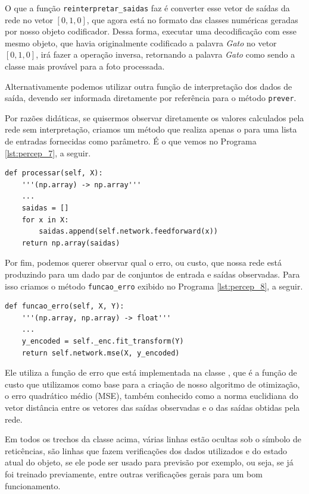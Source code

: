 O que a função \texttt{reinterpretar\_saidas} faz é converter esse vetor de saídas da rede no vetor $[0, 1, 0]$, que agora está no formato das classes numéricas geradas por nosso objeto codificador. Dessa forma, executar uma decodificação com esse mesmo objeto, que havia originalmente codificado a palavra \emph{Gato} no vetor $[0, 1, 0]$, irá fazer a operação inversa, retornando a palavra \emph{Gato} como sendo a classe mais provável para a foto processada.

Alternativamente podemos utilizar outra função de interpretação dos dados de saída, devendo ser informada diretamente por referência para o método \texttt{prever}.

Por razões didáticas, se quisermos observar diretamente os valores calculados pela rede sem interpretação, criamos um método que realiza apenas o  para uma lista de entradas fornecidas como parâmetro. É o que vemos no Programa \ref{lst:percep_7}, a seguir.
\newline
\estiloR
\begin{lstlisting}[caption={Trecho da classe \eng{Perceptron}}, label={lst:percep_7}, escapeinside={\%}]
def processar(self, X):
    '''(np.array) -> np.array'''
    ...
    saidas = []
    for x in X:
        saidas.append(self.network.feedforward(x))
    return np.array(saidas)
\end{lstlisting}


Por fim, podemos querer observar qual o erro, ou custo, que nossa rede está produzindo para um dado par de conjuntos de entrada e saídas observadas. Para isso criamos o método \texttt{funcao\_erro} exibido no Programa \ref{lst:percep_8}, a seguir. 
\newline
\estiloR
\begin{lstlisting}[caption={Trecho da classe \eng{Perceptron}}, label={lst:percep_8}, escapeinside={\%}]
def funcao_erro(self, X, Y):
    '''(np.array, np.array) -> float'''
    ...
    y_encoded = self._enc.fit_transform(Y)
    return self.network.mse(X, y_encoded)
\end{lstlisting}


Ele utiliza a função de erro que está implementada na classe , que é a função de custo que utilizamos como base para a criação de nosso algoritmo de otimização, o erro quadrático médio (MSE), também conhecido como a norma euclidiana do vetor distância entre os vetores das saídas observadas e o das saídas obtidas pela rede.

Em todos os trechos da classe  acima, várias linhas estão ocultas sob o símbolo de reticências, são linhas que fazem verificações dos dados utilizados e do estado atual do objeto, se ele pode ser usado para previsão por exemplo, ou seja, se já foi treinado previamente, entre outras verificações gerais para um bom funcionamento.

